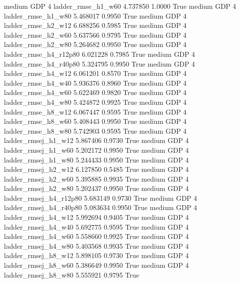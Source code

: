     medium      GDP                 4     ladder_rmse_h1_w60   4.737850      1.0000    True
    medium      GDP                 4     ladder_rmse_h1_w80   5.468017      0.9950    True
    medium      GDP                 4     ladder_rmse_h2_w12   6.688256      0.5985    True
    medium      GDP                 4     ladder_rmse_h2_w60   5.637566      0.9795    True
    medium      GDP                 4     ladder_rmse_h2_w80   5.264682      0.9950    True
    medium      GDP                 4  ladder_rmse_h4_r12p80   6.021228      0.7985    True
    medium      GDP                 4  ladder_rmse_h4_r40p80   5.324795      0.9950    True
    medium      GDP                 4     ladder_rmse_h4_w12   6.061201      0.8570    True
    medium      GDP                 4     ladder_rmse_h4_w40   5.936376      0.8960    True
    medium      GDP                 4     ladder_rmse_h4_w60   5.622469      0.9820    True
    medium      GDP                 4     ladder_rmse_h4_w80   5.424872      0.9925    True
    medium      GDP                 4     ladder_rmse_h8_w12   6.067447      0.9595    True
    medium      GDP                 4     ladder_rmse_h8_w60   5.408443      0.9950    True
    medium      GDP                 4     ladder_rmse_h8_w80   5.742903      0.9595    True
    medium      GDP                 4    ladder_rmsej_h1_w12   5.867406      0.9730    True
    medium      GDP                 4    ladder_rmsej_h1_w60   5.202172      0.9950    True
    medium      GDP                 4    ladder_rmsej_h1_w80   5.244433      0.9950    True
    medium      GDP                 4    ladder_rmsej_h2_w12   6.127850      0.5485    True
    medium      GDP                 4    ladder_rmsej_h2_w60   5.395885      0.9935    True
    medium      GDP                 4    ladder_rmsej_h2_w80   5.202437      0.9950    True
    medium      GDP                 4 ladder_rmsej_h4_r12p80   5.683149      0.9730    True
    medium      GDP                 4 ladder_rmsej_h4_r40p80   5.083634      0.9950    True
    medium      GDP                 4    ladder_rmsej_h4_w12   5.992694      0.9405    True
    medium      GDP                 4    ladder_rmsej_h4_w40   5.692775      0.9595    True
    medium      GDP                 4    ladder_rmsej_h4_w60   5.558660      0.9925    True
    medium      GDP                 4    ladder_rmsej_h4_w80   5.403568      0.9935    True
    medium      GDP                 4    ladder_rmsej_h8_w12   5.898105      0.9730    True
    medium      GDP                 4    ladder_rmsej_h8_w60   5.386649      0.9950    True
    medium      GDP                 4    ladder_rmsej_h8_w80   5.555921      0.9795    True
